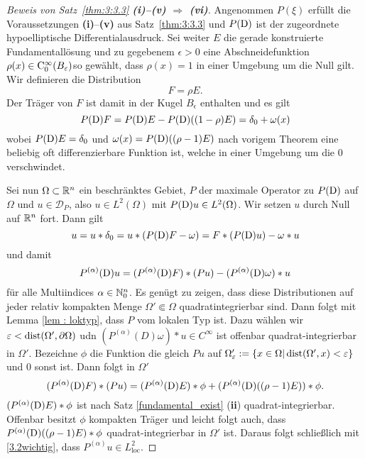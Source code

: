 \begin{proof}[Beweis von Satz~\ref{thm:3:3.3} {\bf (i)--(v) $\Longrightarrow$ (vi)}]
Angenommen $P(\xi)$ erfüllt die Voraussetzungen {\bf (i)}--{\bf(v)} aus Satz~\ref{thm:3:3.3} und $P(\mathrm D)$ ist der zugeordnete hypoelliptische Differentialausdruck. 
Sei weiter $E$ die gerade konstruierte Fundamentallösung und zu gegebenem $\epsilon>0$ eine Abschneidefunktion  $\rho(x)\in \mathrm C_0^\infty(B_\varepsilon)$so gewählt, dass $\rho(x)=1$ in einer Umgebung um die Null gilt. Wir definieren die Distribution
\begin{equation}
F= \rho E.
\end{equation}
Der Träger von $F$ ist damit in der Kugel $B_{\epsilon}$ enthalten und es gilt
\begin{equation}
P(\mathrm D) F= P(\mathrm D) E - P(\mathrm D)((1-\rho)E) =\delta_0 + \omega(x)
\end{equation}  
wobei $P(\mathrm D)E=\delta_0$ und $\omega(x)= P(\mathrm D)((\rho-1)E)$ nach vorigem Theorem eine beliebig oft differenzierbare Funktion ist, welche in einer Umgebung um die $0$ verschwindet.  

Sei nun $\Omega\subset\mathbb R^n$ ein beschränktes Gebiet, $P$ der maximale Operator zu $P(\mathrm D)$ auf $\Omega$ und $u\in \mathcal D_{P}$, also 
$u\in L^2(\Omega)$ mit $P(\mathrm D)u\in L^2(\Omega)$. Wir setzen $u$ durch Null auf $\mathbb R^n$ fort. Dann gilt 
\begin{equation}
u= u*\delta_0 = u * (P(\mathrm D) F-\omega) = F*(P(\mathrm D)u)- \omega *u
\end{equation}
und damit
\begin{equation}\label{3.2wichtig}
P^{(\alpha)}(\mathrm D) u = (P^{(\alpha)}(\mathrm D)F)*(Pu)-(P^{(\alpha)}(\mathrm D) \omega)*u
\end{equation}
für alle Multiindices $\alpha\in\mathbb N_0^n$. Es genügt zu zeigen, dass diese Distributionen auf jeder relativ kompakten Menge $\Omega'\Subset\Omega$ quadratintegrierbar sind.  Dann folgt mit Lemma \ref{lem : loktyp}, dass $P$ vom lokalen Typ ist. Dazu wählen wir $\varepsilon<\operatorname{dist}(\Omega',\partial\Omega)$
udn 
 $(P^{(\alpha)}(D)\omega)*u\in C^\infty$ ist offenbar quadrat-integrierbar in $\Omega'$. 
Bezeichne $\phi$ die Funktion die gleich $Pu$ auf $\Omega'_\varepsilon:=\{x\in \Omega| \operatorname{dist}(\Omega', x)<\varepsilon\}$ und $0$ sonst ist. Dann folgt in $\Omega'$
\begin{equation}
(P^{(\alpha)}(\mathrm D)F)* (Pu) = (P^{(\alpha)}(\mathrm D)E)*\phi+ (P^{(\alpha)}(\mathrm D)((\rho-1)E))*\phi.
\end{equation}
$(P^{(\alpha)}(\mathrm D)E)*\phi$ ist nach Satz \ref{fundamental_exist} ({\bf ii}) quadrat-integrierbar. Offenbar besitzt $\phi$ kompakten Träger und leicht folgt auch, dass $P^{(\alpha)}(\mathrm D)((\rho-1)E)*\phi$ quadrat-integrierbar in $\Omega'$  ist. Daraus folgt schließlich mit \eqref{3.2wichtig}, dass $P^{(\alpha)}u\in L^2_{\text{loc}}$.
\end{proof}



